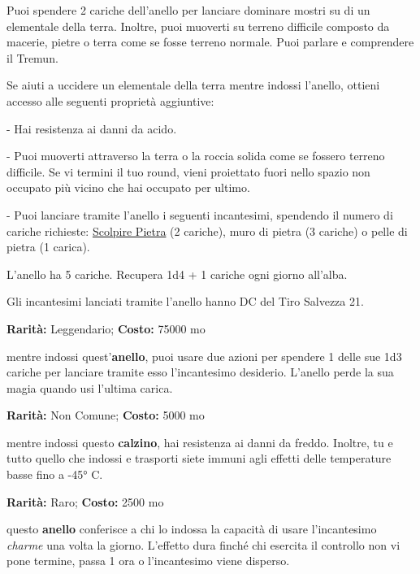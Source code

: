 \begin{multicols}{2}
Puoi spendere 2 cariche dell'anello per lanciare dominare mostri su di un elementale della terra. Inoltre, puoi muoverti su terreno difficile composto da macerie, pietre o terra come se fosse terreno normale. Puoi parlare e comprendere il Tremun.

Se aiuti a uccidere un elementale della terra mentre indossi l'anello, ottieni accesso alle seguenti proprietà aggiuntive:

\smallskip- Hai resistenza ai danni da acido.

\smallskip- Puoi muoverti attraverso la terra o la roccia solida come se fossero terreno difficile. Se vi termini il tuo round, vieni proiettato fuori nello spazio non occupato più vicino che hai occupato per ultimo.

\smallskip- Puoi lanciare tramite l'anello i seguenti incantesimi, spendendo il numero di cariche richieste: \hyperlink{Scolpire Pietra}{Scolpire Pietra} (2 cariche), muro di pietra (3 cariche) o pelle di pietra (1 carica).

\medskip

L'anello ha 5 cariche. Recupera 1d4 + 1 cariche ogni giorno all'alba.

Gli incantesimi lanciati tramite l'anello hanno DC del Tiro Salvezza 21.


\textbf{Rarità:} Leggendario; \textbf{Costo:} 75000 mo

mentre indossi quest'\textbf{anello}, puoi usare due azioni per spendere 1 delle sue 1d3 cariche per lanciare tramite esso l'incantesimo desiderio. L'anello perde la sua magia quando usi l'ultima carica.


\textbf{Rarità:} Non Comune; \textbf{Costo:} 5000 mo

mentre indossi questo \textbf{calzino}, hai resistenza ai danni da freddo. Inoltre, tu e tutto quello che indossi e trasporti siete immuni agli effetti delle temperature basse fino a -45° C.


\textbf{Rarità:} Raro; \textbf{Costo:} 2500 mo

questo \textbf{anello} conferisce a chi lo indossa la capacità di usare l'incantesimo \emph{charme} una volta la giorno. L'effetto dura finché chi esercita il controllo non vi pone termine, passa 1 ora o l'incantesimo viene disperso.


\end{multicols}
